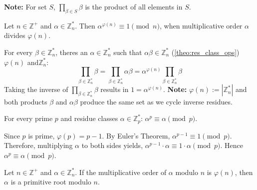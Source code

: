     \begin{Note}
        \textbf{Note:} For set $S$, $\prod_{\beta\in S}\beta$ is the product of all elements in $S$. 
    \end{Note}
    \begin{theo}
        
        Let $n\in\mathbb{Z^+}$ and $\alpha\in\mathbb{Z}_n^*$. Then $\alpha^{\varphi(n)}\equiv 1\pmod{n}$, when multiplicative order $\alpha$ divides $\varphi(n)$.
    \end{theo}
    \begin{Proof}
        For every $\beta\in\mathbb{Z}_n^*$, theres an $\alpha\in\mathbb{Z}_n^*$ such that $\alpha\beta\in\mathbb{Z}_n^*$ (\ref{theo:res_class_ops}) $\varphi(n)$ and$\mathbb{Z}_n^*$:
        \[\prod_{\beta\in\mathbb{Z}_n^*}\beta=\prod_{\beta\in\mathbb{Z}_n^*}\alpha\beta=\alpha^{\varphi(n)}\prod_{\beta\in\mathbb{Z}_n^*}\beta\]
        Taking the inverse of $\prod_{\beta\in\mathbb{Z}_n^*}\beta$ results in $1=\alpha^{\varphi(n)}$. \textbf{Note:} $\varphi(n):=|\mathbb{Z}_n^*|$ and both products $\beta$ and $\alpha\beta$ produce the same set as we cycle inverse residues.
        

    \end{Proof}

    \newpage

    \begin{theo}
        
        For every prime $p$ and residue classes $\alpha\in\mathbb{Z}_p^*$: $\alpha^{p} \equiv \alpha \pmod{p}$.
    \end{theo}

    \begin{Proof}
        Since $p$ is prime, $\varphi(p)=p-1$. By Euler's Theorem, $\alpha^{p-1} \equiv 1 \pmod{p}$. 
        Therefore, multiplying $\alpha$ to both sides yields, $\alpha^{p-1} \cdot \alpha \equiv 1 \cdot \alpha \pmod{p}$. Hence $\alpha^p \equiv \alpha \pmod{p}$.
    \end{Proof}

    \begin{Def}
        
        Let $n\in\mathbb{Z^+}$ and $\alpha\in\mathbb{Z}_n^*$. If the multiplicative order of $\alpha$ modulo $n$ is $\varphi(n)$, then $\alpha$ is a primitive root modulo $n$.
    \end{Def}

